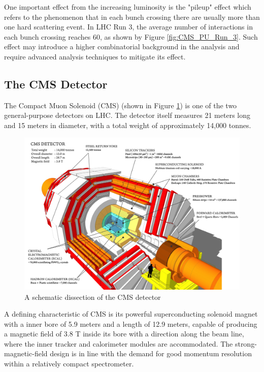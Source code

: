 \documentclass[10pt,twocolumn]{article}
\begin{document}
One important effect from the increasing luminosity is the "pileup" effect which refers to the phenomenon that in each bunch crossing there are usually more than one hard scattering event.\cite{CMS:LUMI-PUB} In LHC Run 3, the average number of interactions in each bunch crossing reaches 60, as shown by Figure \ref{fig:CMS_PU_Run_3}. Such effect may introduce a higher combinatorial background in the analysis and require advanced analysis techniques to mitigate its effect.



\subsection{The CMS Detector}

The Compact Muon Solenoid (CMS) (shown in Figure \ref{fig:CMS-disection}) is one of the two general-purpose detectors on LHC. The detector itself measures 21 meters long and 15 meters in diameter, with a total weight of approximately 14,000 tonnes.

\begin{figure}
    \centering
    \includegraphics[width=1.0\linewidth]{images/CMS_disection_Run2.png}
    \caption{A schematic dissection of the CMS detector}
    \label{fig:CMS-disection}
\end{figure}

A defining characteristic of CMS is its powerful superconducting solenoid magnet with a inner bore of 5.9 meters and a length of 12.9 meters, capable of producing a magnetic field of 3.8 T inside its bore with a direction along the beam line, where the inner tracker and calorimeter modules are accommodated. The strong-magnetic-field design is in line with the demand for good momentum resolution within a relatively compact spectrometer.
\end{document}
